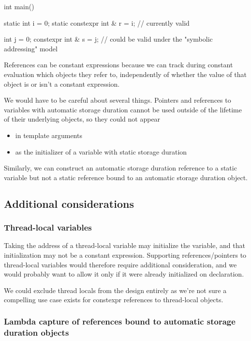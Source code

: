 \documentclass{wg21}
\begin{document}
\begin{colorblock}
int main() {
    static int i = 0;
    static constexpr int & r = i; // currently valid

    int j = 0;
    constexpr int & s = j; // could be valid under the "symbolic addressing" model
}
\end{colorblock}

References can be constant expressions because we can track during constant evaluation which objects they refer to, independently of whether the value of that object is or isn't a constant expression.

We would have to be careful about several things.
Pointers and references to variables with automatic storage duration cannot be used outside of the lifetime of their underlying objects, so they could not appear
\begin{itemize}
  \item in template arguments
  \item as the initializer of a variable with static storage duration
\end{itemize}

Similarly, we can construct an automatic storage duration  reference to a static variable but not a static  reference bound to an automatic storage duration object.

\subsection{Additional considerations}

\subsubsection{Thread-local variables}

Taking the address of a thread-local variable may initialize the variable, and that initialization may not be a constant expression.
Supporting references/pointers to thread-local variables would therefore require additional consideration, and we would probably want to allow it only if it were  already initialized
on declaration.

We could exclude thread locals from the design entirely as we're not sure a compelling use case exists for constexpr references to thread-local objects.

\subsubsection{Lambda capture of  references bound to automatic storage duration objects}
\end{document}
